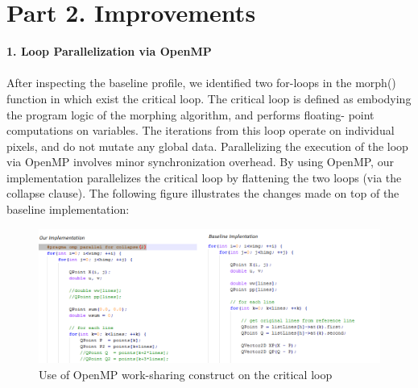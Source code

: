 \documentclass[12pt]{article}
\begin{document}
\section*{Part 2. Improvements}
{\bf 1. Loop Parallelization via OpenMP}
\\
\\
After inspecting the baseline profile, we identified two for-loops in the morph() function in which exist the
critical loop. The critical loop is defined as embodying the program logic of the morphing algorithm, and performs floating-
point computations on variables. The iterations from this loop operate on individual pixels, and do not
mutate any global data. Parallelizing the execution of the loop via OpenMP involves minor synchronization
overhead. By using OpenMP, our implementation parallelizes the critical loop by flattening the two loops
(via the collapse clause). The following figure illustrates the changes made on top of the baseline
implementation:

\begin{figure}[H]%
\centering%
\includegraphics[scale=0.7]{codechange1.png}%
\caption{Use of OpenMP work-sharing construct on the critical loop}%
\label{fig:codechange1}%
\end{figure}
\end{document}

